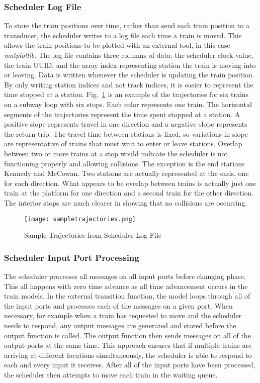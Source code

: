 \subsubsection{Scheduler Log File}
To store the train positions over time, rather than send each train position to a transducer, the scheduler writes to a log file each time a train is moved. This allows the train positions to be plotted with an external tool, in this case \textit{matplotlib}.  The log file contains three columns of data: the scheduler clock value, the train UUID, and the array index representing station the train is moving into or leaving.  Data is written whenever the scheduler is updating the train position.  By only writing station indices and not track indices, it is easier to represent the time stopped at a station.  Fig.~\ref{fig:sampletrajectories} is an example of the trajectories for six trains on a subway loop with six stops.  Each color represents one train.  The horizontal segments of the trajectories represent the time spent stopped at a station. A positive slope represents travel in one direction and a negative slope represents the return trip. The travel time between stations is fixed, so variations in slope are representative of trains that must wait to enter or leave stations.  Overlap between two or more trains at a stop would indicate the scheduler is not functioning properly and allowing collisions.  The exception is the end stations Kennedy and McCowan.  Two stations are actually represented at the ends, one for each direction.  What appears to be overlap between trains is actually just one train at the platform for one direction and a second train for the other direction.  The interior stops are much clearer in showing that no collisions are occurring.  
%
\begin{figure}[htb]
	\centering
	\texttt{[image: sampletrajectories.png]}
	\caption{Sample Trajectories from Scheduler Log File}
	\label{fig:sampletrajectories}
\end{figure}

\subsubsection{Scheduler Input Port Processing}
The scheduler processes all messages on all input ports before changing phase.  This all happens with zero time advance as all time advancement occurs in the train models.  In the external transition function, the model loops through all of the input ports and processes each of the messages on a given port.  When necessary, for example when a train has requested to move and the scheduler needs to respond, any output messages are generated and stored before the output function is called.  The output function then sends messages on all of the output ports at the same time.  This approach ensures that if multiple trains are arriving at different locations simultaneously, the scheduler is able to respond to each and every input it receives.  After all of the input ports have been processed, the scheduler then attempts to move each train in the waiting queue.

